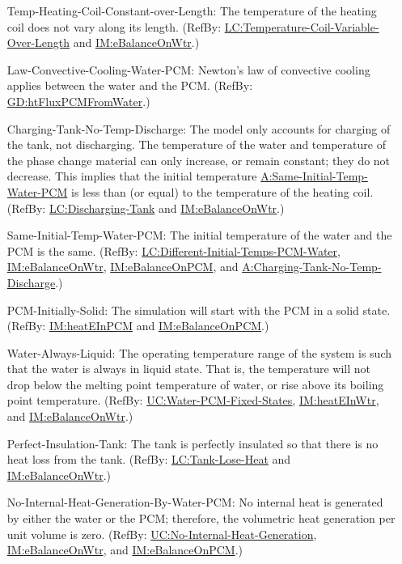 \documentclass[12pt]{article}
\begin{document}
\begin{itemize}
\item[Temp-Heating-Coil-Constant-over-Length:\phantomsection\label{assumpTHCCoL}]{The temperature of the heating coil does not vary along its length. (RefBy: \hyperref[likeChgTCVOL]{LC:Temperature-Coil-Variable-Over-Length} and \hyperref[IM:eBalanceOnWtr]{IM:eBalanceOnWtr}.)}
\item[Law-Convective-Cooling-Water-PCM:\phantomsection\label{assumpLCCWP}]{Newton's law of convective cooling applies between the water and the PCM. (RefBy: \hyperref[GD:htFluxPCMFromWater]{GD:htFluxPCMFromWater}.)}
\item[Charging-Tank-No-Temp-Discharge:\phantomsection\label{assumpCTNOD}]{The model only accounts for charging of the tank, not discharging. The temperature of the water and temperature of the phase change material can only increase, or remain constant; they do not decrease. This implies that the initial temperature \hyperref[assumpSITWP]{A:Same-Initial-Temp-Water-PCM} is less than (or equal) to the temperature of the heating coil. (RefBy: \hyperref[likeChgDT]{LC:Discharging-Tank} and \hyperref[IM:eBalanceOnWtr]{IM:eBalanceOnWtr}.)}
\item[Same-Initial-Temp-Water-PCM:\phantomsection\label{assumpSITWP}]{The initial temperature of the water and the PCM is the same. (RefBy: \hyperref[likeChgDITPW]{LC:Different-Initial-Temps-PCM-Water}, \hyperref[IM:eBalanceOnWtr]{IM:eBalanceOnWtr}, \hyperref[IM:eBalanceOnPCM]{IM:eBalanceOnPCM}, and \hyperref[assumpCTNOD]{A:Charging-Tank-No-Temp-Discharge}.)}
\item[PCM-Initially-Solid:\phantomsection\label{assumpPIS}]{The simulation will start with the PCM in a solid state. (RefBy: \hyperref[IM:heatEInPCM]{IM:heatEInPCM} and \hyperref[IM:eBalanceOnPCM]{IM:eBalanceOnPCM}.)}
\item[Water-Always-Liquid:\phantomsection\label{assumpWAL}]{The operating temperature range of the system is such that the water is always in liquid state. That is, the temperature will not drop below the melting point temperature of water, or rise above its boiling point temperature. (RefBy: \hyperref[unlikeChgWPFS]{UC:Water-PCM-Fixed-States}, \hyperref[IM:heatEInWtr]{IM:heatEInWtr}, and \hyperref[IM:eBalanceOnWtr]{IM:eBalanceOnWtr}.)}
\item[Perfect-Insulation-Tank:\phantomsection\label{assumpPIT}]{The tank is perfectly insulated so that there is no heat loss from the tank. (RefBy: \hyperref[likeChgTLH]{LC:Tank-Lose-Heat} and \hyperref[IM:eBalanceOnWtr]{IM:eBalanceOnWtr}.)}
\item[No-Internal-Heat-Generation-By-Water-PCM:\phantomsection\label{assumpNIHGBWP}]{No internal heat is generated by either the water or the PCM; therefore, the volumetric heat generation per unit volume is zero. (RefBy: \hyperref[unlikeChgNIHG]{UC:No-Internal-Heat-Generation}, \hyperref[IM:eBalanceOnWtr]{IM:eBalanceOnWtr}, and \hyperref[IM:eBalanceOnPCM]{IM:eBalanceOnPCM}.)}

\end{itemize}
\end{document}
